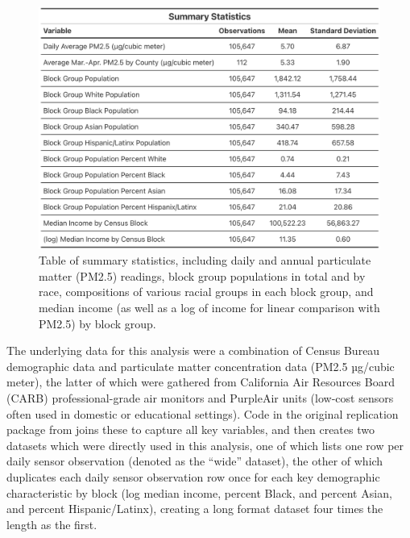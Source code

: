 \documentclass[12pt, ]{article}
\begin{document}
\begin{figure}[H]

{\centering \includegraphics{figures/PM_SumStatsTable.png}

}

\caption{\label{fig-sumtable}Table of summary statistics, including
daily and annual particulate matter (PM2.5) readings, block group
populations in total and by race, compositions of various racial groups
in each block group, and median income (as well as a log of income for
linear comparison with PM2.5) by block group.}

\end{figure}

The underlying data for this analysis were a combination of Census
Bureau demographic data and particulate matter concentration data (PM2.5
µg/cubic meter), the latter of which were gathered from California Air
Resources Board (CARB) professional-grade air monitors and PurpleAir
units (low-cost sensors often used in domestic or educational settings).
Code in the original replication package from
\citet{bluhm_disparate_2022} joins these to capture all key variables,
and then creates two datasets which were directly used in this analysis,
one of which lists one row per daily sensor observation (denoted as the
``wide'' dataset), the other of which duplicates each daily sensor
observation row once for each key demographic characteristic by block
(log median income, percent Black, and percent Asian, and percent
Hispanic/Latinx), creating a long format dataset four times the length
as the first.
\end{document}
